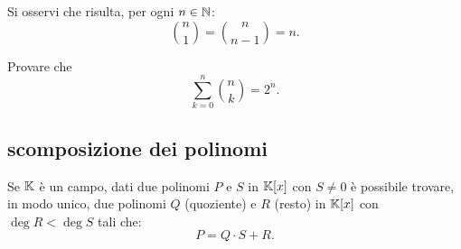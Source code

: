 Si osservi che risulta, per ogni $n\in {\mathbb N}$:
\[
  {n \choose 1} = {n \choose n-1} = n.
\]
  
\begin{exercise}
  Provare che
  \[
   \sum_{k=0}^n {n \choose k} = 2^n.
  \]
\end{exercise}  


\subsection{scomposizione dei polinomi}

\begin{theorem}
  \label{th:divisione_polinomi}%
  Se ${\mathbb K}$ è un campo,
  dati due polinomi $P$ e $S$ in ${\mathbb K}[x]$ con $S\neq 0$ è possibile
  trovare, in modo unico, due polinomi $Q$ (quoziente)
  e $R$ (resto) in ${\mathbb K}[x]$ con $\deg R < \deg S$
  tali che:
  \[
    P = Q \cdot S + R.
  \]
  \end{theorem}
